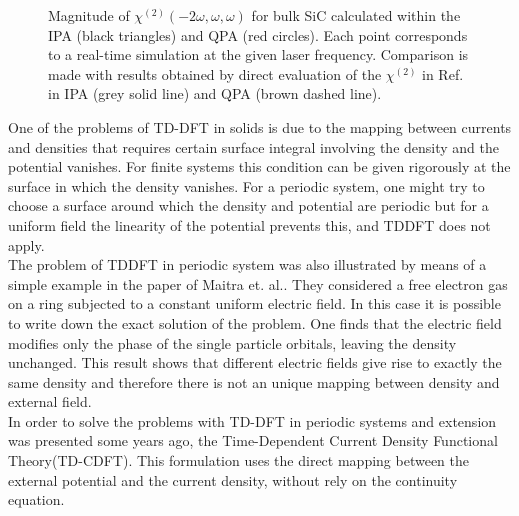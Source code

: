 \begin{figure}
\centering
{}
\caption{\footnotesize{Magnitude of $\chi^{(2)}(-2\omega,\omega,\omega)$ for bulk SiC calculated within the IPA (black triangles) and QPA (red circles). Each point corresponds to a real-time simulation at the given laser frequency. Comparison is made with results obtained \ai by direct evaluation of the $\chi^{(2)}$ in Ref.~\cite{PhysRevB.82.235201} in IPA (grey solid line) and QPA (brown dashed line).  \label{fg:SiCQPRPA} }}
\end{figure}

One of the problems of TD-DFT in solids is due to the mapping between currents and densities that requires certain surface integral involving the density and the potential vanishes. For finite systems this condition  can be given rigorously at the surface in which the density vanishes. For a periodic system, one might try to choose a surface around which the density and potential are periodic but for a uniform field the linearity of the potential prevents this, and TDDFT does not apply.\cite{Gonze1995} \\
The problem of TDDFT in periodic system was also illustrated  by means of a simple example in the paper of Maitra et. al.\cite{maitra2003current}. They considered a free electron gas on a ring subjected to a constant uniform electric field. In this case it is possible to write down the exact solution of the problem. One finds that the electric field modifies only the phase of the single particle orbitals, leaving the density unchanged. This result shows that different electric fields  give rise to exactly the same density and therefore there is not an unique mapping between density and external field.\\
In order to solve the problems with TD-DFT in periodic systems and extension was presented some years ago, the Time-Dependent Current Density Functional Theory(TD-CDFT)\cite{PhysRevA.38.1149}. This formulation uses the direct mapping between the external potential and the current density, without rely on the continuity equation.\\


